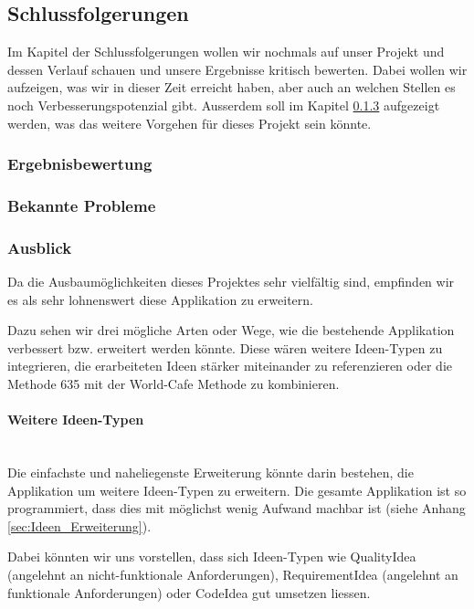 \subsection{Schlussfolgerungen}
Im Kapitel der Schlussfolgerungen wollen wir nochmals auf unser Projekt und dessen Verlauf schauen und unsere Ergebnisse kritisch bewerten. Dabei wollen wir aufzeigen, was wir in dieser Zeit erreicht haben, aber auch an welchen Stellen es noch Verbesserungspotenzial gibt. Ausserdem soll im Kapitel \ref{subsub:Ausblick} aufgezeigt werden, was das weitere Vorgehen für dieses Projekt sein könnte.

\subsubsection{Ergebnisbewertung}

\subsubsection{Bekannte Probleme}

\subsubsection{Ausblick}
\label{subsub:Ausblick}
Da die Ausbaumöglichkeiten dieses Projektes sehr vielfältig sind, empfinden wir es als sehr lohnenswert diese Applikation zu erweitern.

Dazu sehen wir drei mögliche Arten oder Wege, wie die bestehende Applikation verbessert bzw. erweitert werden könnte. Diese wären weitere Ideen-Typen zu integrieren, die erarbeiteten Ideen stärker miteinander zu referenzieren oder die Methode 635 mit der World-Cafe Methode zu kombinieren.

\paragraph*{Weitere Ideen-Typen}~\\
Die einfachste und naheliegenste Erweiterung könnte darin bestehen, die Applikation um weitere Ideen-Typen zu erweitern. Die gesamte Applikation ist so programmiert, dass dies mit möglichst wenig Aufwand machbar ist (siehe Anhang \ref{sec:Ideen_Erweiterung}). 

Dabei könnten wir uns vorstellen, dass sich Ideen-Typen wie QualityIdea (angelehnt an nicht-funktionale Anforderungen), RequirementIdea (angelehnt an funktionale Anforderungen)  oder CodeIdea gut umsetzen liessen.

